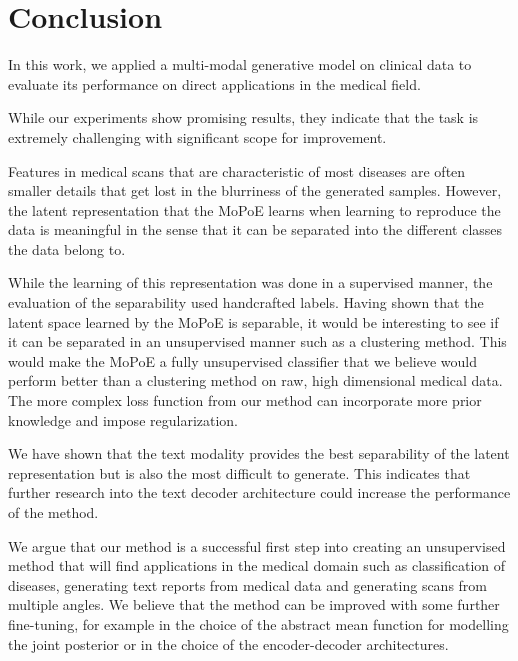\section{Conclusion}
In this work, we applied a multi-modal generative model on clinical data to evaluate its performance on direct applications in the medical field.

While our experiments show promising results, they indicate that the task is extremely challenging with significant scope for improvement.

Features in medical scans that are characteristic of most diseases are often smaller details that get lost in the blurriness of the generated samples.
However, the latent representation that the MoPoE learns when learning to reproduce the data is meaningful in the sense that it can be separated into the different classes the data belong to.

While the learning of this representation was done in a supervised manner, the evaluation of the separability used handcrafted labels.
Having shown that the latent space learned by the MoPoE is separable, it would be interesting to see if it can be separated in an unsupervised manner such as a clustering method.
This would make the MoPoE a fully unsupervised classifier that we believe would perform better than a clustering method on raw, high dimensional medical data.
The more complex loss function from our method can incorporate more prior knowledge and impose regularization.


We have shown that the text modality provides the best separability of the latent representation but is also the most difficult to generate.
This indicates that further research into the text decoder architecture could increase the performance of the method.



We argue that our method is a successful first step into creating an unsupervised method that will find applications in the medical domain such as classification of diseases, generating text reports from medical data and generating scans from multiple angles.
We believe that the method can be improved with some further fine-tuning, for example in the choice of the abstract mean function for modelling the joint posterior or in the choice of the encoder-decoder architectures.
